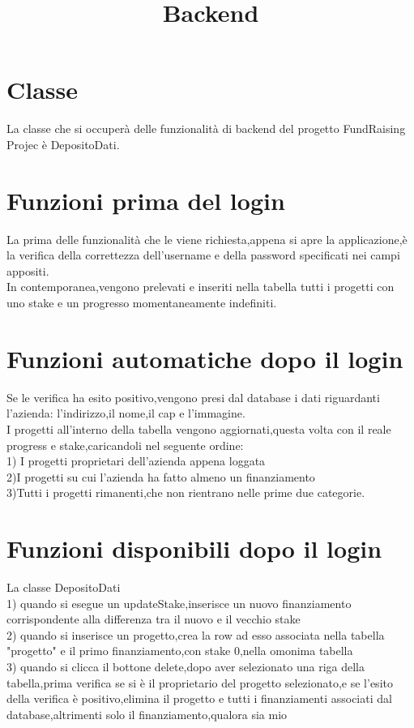 \documentclass[12pt]{article}
\begin{document}
 
\title{Backend}
\maketitle

\section {Classe}
La classe che si occuperà delle funzionalità di backend del progetto FundRaising Projec è DepositoDati.

\section {Funzioni prima del login}

La prima delle funzionalità che le viene richiesta,appena si apre la applicazione,è la verifica della correttezza dell'username e della password specificati nei campi appositi.\\
In contemporanea,vengono prelevati e inseriti nella tabella tutti i progetti con uno stake e un progresso momentaneamente indefiniti.\\

\section {Funzioni automatiche dopo il  login}
Se le verifica ha esito positivo,vengono presi dal database i dati riguardanti l'azienda: l'indirizzo,il nome,il cap e l'immagine.\\
I progetti all'interno della tabella vengono aggiornati,questa volta con il reale progress e stake,caricandoli nel seguente ordine: \\
1) I progetti proprietari dell'azienda appena loggata \\
2)I progetti su cui l'azienda ha fatto almeno un finanziamento \\
3)Tutti i progetti rimanenti,che non rientrano nelle prime due categorie.\\

\section {Funzioni disponibili dopo il login}

La classe DepositoDati \\
1) quando si esegue un updateStake,inserisce un nuovo finanziamento corrispondente alla differenza tra il nuovo e il vecchio stake \\
2) quando si inserisce un progetto,crea la row ad esso associata nella tabella "progetto" e il primo finanziamento,con stake 0,nella omonima tabella \\
3)  quando si clicca il bottone delete,dopo aver selezionato una riga della tabella,prima verifica se si è il proprietario del progetto selezionato,e se l'esito della verifica è positivo,elimina il progetto e tutti i finanziamenti associati dal database,altrimenti solo il finanziamento,qualora sia mio
\end{document}
